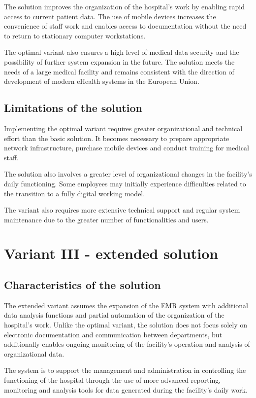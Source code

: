     The solution improves the organization of the hospital's work by enabling rapid access to current patient data. The use of mobile devices increases the convenience of staff work and enables access to documentation without the need to return to stationary computer workstations.

    The optimal variant also ensures a high level of medical data security and the possibility of further system expansion in the future. The solution meets the needs of a large medical facility and remains consistent with the direction of development of modern eHealth systems in the European Union.

    \subsection{Limitations of the solution}
    Implementing the optimal variant requires greater organizational and technical effort than the basic solution. It becomes necessary to prepare appropriate network infrastructure, purchase mobile devices and conduct training for medical staff.

    The solution also involves a greater level of organizational changes in the facility's daily functioning. Some employees may initially experience difficulties related to the transition to a fully digital working model.

    The variant also requires more extensive technical support and regular system maintenance due to the greater number of functionalities and users.

    \section{Variant III - extended solution}

    \subsection{Characteristics of the solution}
    The extended variant assumes the expansion of the EMR system with additional data analysis functions and partial automation of the organization of the hospital's work. Unlike the optimal variant, the solution does not focus solely on electronic documentation and communication between departments, but additionally enables ongoing monitoring of the facility's operation and analysis of organizational data.

    The system is to support the management and administration in controlling the functioning of the hospital through the use of more advanced reporting, monitoring and analysis tools for data generated during the facility's daily work.
